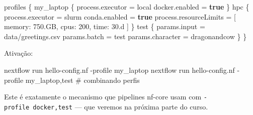 \documentclass[
  brazilian,
  letterpaper,
  DIV=11,
  numbers=noendperiod]{scrreprt}
\newenvironment{Shaded}{\begin{snugshade}}{\end{snugshade}}
\newcommand{\AttributeTok}[1]{\textcolor[rgb]{0.40,0.45,0.13}{#1}}
\newcommand{\CommentTok}[1]{\textcolor[rgb]{0.37,0.37,0.37}{#1}}
\newcommand{\DecValTok}[1]{\textcolor[rgb]{0.68,0.00,0.00}{#1}}
\newcommand{\ExtensionTok}[1]{\textcolor[rgb]{0.00,0.23,0.31}{#1}}
\newcommand{\FloatTok}[1]{\textcolor[rgb]{0.68,0.00,0.00}{#1}}
\newcommand{\KeywordTok}[1]{\textcolor[rgb]{0.00,0.23,0.31}{\textbf{#1}}}
\newcommand{\NormalTok}[1]{\textcolor[rgb]{0.00,0.23,0.31}{#1}}
\newcommand{\OperatorTok}[1]{\textcolor[rgb]{0.37,0.37,0.37}{#1}}
\newcommand{\StringTok}[1]{\textcolor[rgb]{0.13,0.47,0.30}{#1}}
\begin{document}
\begin{Shaded}
\begin{Highlighting}[]
\NormalTok{profiles }\OperatorTok{\{}
\NormalTok{    my\_laptop }\OperatorTok{\{}
\NormalTok{        process}\OperatorTok{.}\NormalTok{executor }\OperatorTok{=} \StringTok{\textquotesingle{}local\textquotesingle{}}
\NormalTok{        docker}\OperatorTok{.}\NormalTok{enabled   }\OperatorTok{=} \KeywordTok{true}
    \OperatorTok{\}}
\NormalTok{    hpc }\OperatorTok{\{}
\NormalTok{        process}\OperatorTok{.}\NormalTok{executor }\OperatorTok{=} \StringTok{\textquotesingle{}slurm\textquotesingle{}}
\NormalTok{        conda}\OperatorTok{.}\NormalTok{enabled    }\OperatorTok{=} \KeywordTok{true}
\NormalTok{        process}\OperatorTok{.}\NormalTok{resourceLimits }\OperatorTok{=} \OperatorTok{[}
\NormalTok{            memory}\OperatorTok{:} \FloatTok{750.}\NormalTok{GB}\OperatorTok{,}
\NormalTok{            cpus}\OperatorTok{:}   \DecValTok{200}\OperatorTok{,}
\NormalTok{            time}\OperatorTok{:}   \FloatTok{30.d}
        \OperatorTok{]}
    \OperatorTok{\}}
\NormalTok{    test }\OperatorTok{\{}
\NormalTok{        params}\OperatorTok{.}\NormalTok{input     }\OperatorTok{=} \StringTok{\textquotesingle{}data/greetings.csv\textquotesingle{}}
\NormalTok{        params}\OperatorTok{.}\NormalTok{batch     }\OperatorTok{=} \StringTok{\textquotesingle{}test\textquotesingle{}}
\NormalTok{        params}\OperatorTok{.}\NormalTok{character }\OperatorTok{=} \StringTok{\textquotesingle{}dragonandcow\textquotesingle{}}
    \OperatorTok{\}}
\OperatorTok{\}}
\end{Highlighting}
\end{Shaded}

Ativação:

\begin{Shaded}
\begin{Highlighting}[]
\ExtensionTok{nextflow}\NormalTok{ run hello{-}config.nf }\AttributeTok{{-}profile}\NormalTok{ my\_laptop}
\ExtensionTok{nextflow}\NormalTok{ run hello{-}config.nf }\AttributeTok{{-}profile}\NormalTok{ my\_laptop,test   }\CommentTok{\# combinando perfis}
\end{Highlighting}
\end{Shaded}

\begin{tcolorbox}[enhanced jigsaw, arc=.35mm, bottomrule=.15mm, bottomtitle=1mm, breakable, colback=white, colbacktitle=quarto-callout-note-color!10!white, colframe=quarto-callout-note-color-frame, coltitle=black, left=2mm, leftrule=.75mm, opacityback=0, opacitybacktitle=0.6, rightrule=.15mm, title=\textcolor{quarto-callout-note-color}{\faInfo}\hspace{0.5em}{Nota}, titlerule=0mm, toprule=.15mm, toptitle=1mm]

Este é exatamente o mecanismo que pipelines nf-core usam com
\texttt{-profile\ docker,test} --- que veremos na próxima parte do
curso.

\end{tcolorbox}
\end{document}
